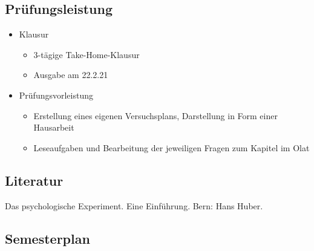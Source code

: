 \documentclass[
]{book}
\providecommand{\tightlist}{%
  \setlength{\itemsep}{0pt}\setlength{\parskip}{0pt}}
\begin{document}
\hypertarget{pruxfcfungsleistung}{%
\subsection*{Prüfungsleistung}\label{pruxfcfungsleistung}}

\begin{itemize}
\tightlist
\item
  Klausur

  \begin{itemize}
  \tightlist
  \item
    3-tägige Take-Home-Klausur
  \item
    Ausgabe am 22.2.21
  \end{itemize}
\item
  Prüfungsvorleistung

  \begin{itemize}
  \tightlist
  \item
    Erstellung eines eigenen Versuchsplans, Darstellung in Form einer Hausarbeit
  \item
    Leseaufgaben und Bearbeitung der jeweiligen Fragen zum Kapitel im Olat
  \end{itemize}
\end{itemize}

\hypertarget{literatur}{%
\subsection*{Literatur}\label{literatur}}

\citet{huberPsychologischeExperiment2019} Das psychologische Experiment. Eine Einführung. Bern: Hans Huber.

\hypertarget{semesterplan-1}{%
\subsection{Semesterplan}\label{semesterplan-1}}

\small
\end{document}
